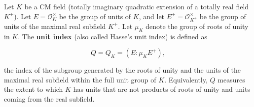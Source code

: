 Let $K$ be a CM field (totally imaginary quadratic extension of a totally real field $K^+$). Let $E = \mathcal{O}_K^\times$ be the group of units of $K$, and let $E^+ = \mathcal{O}_{K^+}^\times$ be the group of units of the maximal real subfield $K^+$. Let $\mu_K$ denote the group of roots of unity in $K$. The \textbf{unit index} (also called Hasse's unit index) is defined as

$$Q = Q_K = \left( E : \mu_K E^+ \right),$$

the index of the subgroup generated by the roots of unity and the units of the maximal real subfield within the full unit group of $K$. Equivalently, $Q$ measures the extent to which $K$ has units that are not products of roots of unity and units coming from the real subfield.
